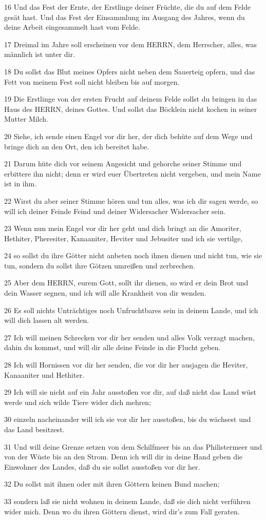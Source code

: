 \par 16 Und das Fest der Ernte, der Erstlinge deiner Früchte, die du auf dem Felde gesät hast. Und das Fest der Einsammlung im Ausgang des Jahres, wenn du deine Arbeit eingesammelt hast vom Felde.
\par 17 Dreimal im Jahre soll erscheinen vor dem HERRN, dem Herrscher, alles, was männlich ist unter dir.
\par 18 Du sollst das Blut meines Opfers nicht neben dem Sauerteig opfern, und das Fett von meinem Fest soll nicht bleiben bis auf morgen.
\par 19 Die Erstlinge von der ersten Frucht auf deinem Felde sollst du bringen in das Haus des HERRN, deines Gottes. Und sollst das Böcklein nicht kochen in seiner Mutter Milch.
\par 20 Siehe, ich sende einen Engel vor dir her, der dich behüte auf dem Wege und bringe dich an den Ort, den ich bereitet habe.
\par 21 Darum hüte dich vor seinem Angesicht und gehorche seiner Stimme und erbittere ihn nicht; denn er wird euer Übertreten nicht vergeben, und mein Name ist in ihm.
\par 22 Wirst du aber seiner Stimme hören und tun alles, was ich dir sagen werde, so will ich deiner Feinde Feind und deiner Widersacher Widersacher sein.
\par 23 Wenn nun mein Engel vor dir her geht und dich bringt an die Amoriter, Hethiter, Pheresiter, Kanaaniter, Heviter und Jebusiter und ich sie vertilge,
\par 24 so sollst du ihre Götter nicht anbeten noch ihnen dienen und nicht tun, wie sie tun, sondern du sollst ihre Götzen umreißen und zerbrechen.
\par 25 Aber dem HERRN, eurem Gott, sollt ihr dienen, so wird er dein Brot und dein Wasser segnen, und ich will alle Krankheit von dir wenden.
\par 26 Es soll nichts Unträchtiges noch Unfruchtbares sein in deinem Lande, und ich will dich lassen alt werden.
\par 27 Ich will meinen Schrecken vor dir her senden und alles Volk verzagt machen, dahin du kommst, und will dir alle deine Feinde in die Flucht geben.
\par 28 Ich will Hornissen vor dir her senden, die vor dir her ausjagen die Heviter, Kanaaniter und Hethiter.
\par 29 Ich will sie nicht auf ein Jahr ausstoßen vor dir, auf daß nicht das Land wüst werde und sich wilde Tiere wider dich mehren;
\par 30 einzeln nacheinander will ich sie vor dir her ausstoßen, bis du wächsest und das Land besitzest.
\par 31 Und will deine Grenze setzen von dem Schilfmeer bis an das Philistermeer und von der Wüste bis an den Strom. Denn ich will dir in deine Hand geben die Einwohner des Landes, daß du sie sollst ausstoßen vor dir her.
\par 32 Du sollst mit ihnen oder mit ihren Göttern keinen Bund machen;
\par 33 sondern laß sie nicht wohnen in deinem Lande, daß sie dich nicht verführen wider mich. Denn wo du ihren Göttern dienst, wird dir's zum Fall geraten.

